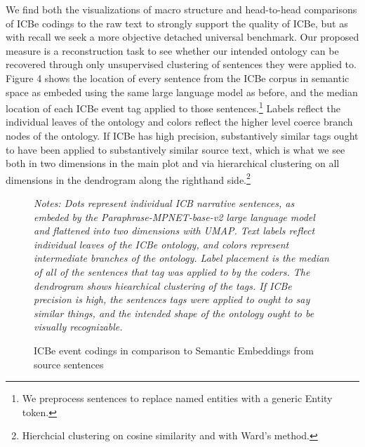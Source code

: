 \documentclass{article}
\begin{document}
We find both the visualizations of macro structure and head-to-head
comparisons of ICBe codings to the raw text to strongly support the
quality of ICBe, but as with recall we seek a more objective detached
universal benchmark. Our proposed measure is a reconstruction task to
see whether our intended ontology can be recovered through only
unsupervised clustering of sentences they were applied to. Figure 4
shows the location of every sentence from the ICBe corpus in semantic
space as embeded using the same large language model as before, and the
median location of each ICBe event tag applied to those
sentences.\footnote{We preprocess sentences to replace named entities
  with a generic Entity token.} Labels reflect the individual leaves of
the ontology and colors reflect the higher level coerce branch nodes of
the ontology. If ICBe has high precision, substantively similar tags
ought to have been applied to substantively similar source text, which
is what we see both in two dimensions in the main plot and via
hierarchical clustering on all dimensions in the dendrogram along the
righthand side.\footnote{Hierchcial clustering on cosine similarity and
  with Ward's method.}

\clearpage
\onecolumn
\begin{figure}[H]
\caption{ICBe event codings in comparison to Semantic Embeddings from source sentences\label{fig:semantic_embeddings}}
\textit{Notes: Dots represent individual ICB narrative sentences, as embeded by the Paraphrase-MPNET-base-v2 large language model and flattened into two dimensions with UMAP. Text labels reflect individual leaves of the ICBe ontology, and colors represent intermediate branches of the ontology. Label placement is the median of all of the sentences that tag was applied to by the coders. The dendrogram shows hiearchical clustering of the tags. If ICBe precision is high, the sentences tags were applied to ought to say similar things, and the intended shape of the ontology ought to be visually recognizable. }
\end{figure}
\clearpage
\twocolumn
\end{document}
